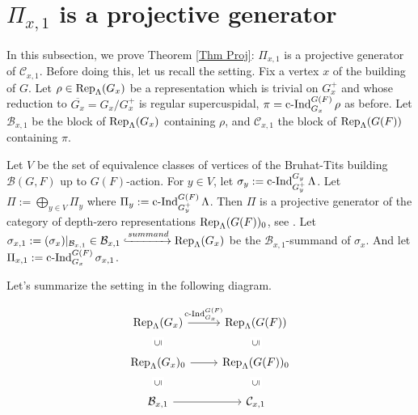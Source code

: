 		
		
		
		\section{$\Pi_{x,1}$ is a projective generator}\label{Section projective generator}
		
		In this subsection, we prove Theorem \ref{Thm Proj}: $\Pi_{x,1}$ is a projective generator of $\mathcal{C}_{x,1}$. Before doing this, let us recall the setting. Fix a vertex $x$ of the building of $G$. Let $\rho \in \operatorname{\operatorname{Rep}}_{\Lambda}(G_x)$ be a representation which is trivial on $G_x^+$ and whose reduction to $\overline{G_x}=G_x/G_x^+$ is regular supercuspidal, $\pi=\operatorname{\operatorname{c-Ind}}_{G_x}^{G(F)}\rho$ as before. Let $\mathcal{B}_{x,1}$ be the block of $\operatorname{\operatorname{Rep}}_{\Lambda}(G_x)$ containing $\rho$, and $\mathcal{C}_{x,1}$ the block of $\operatorname{\operatorname{Rep}}_{\Lambda}(G(F))$ containing $\pi$. 
		
		Let $V$ be the set of equivalence classes of vertices of the Bruhat-Tits building $\mathcal{B}(G, F)$ up to $G(F)$-action. For $y \in V$, let $\sigma_y:=\operatorname{\operatorname{c-Ind}}_{G_y^+}^{G_y}\Lambda$. Let $\Pi:=\bigoplus_{y \in V}\Pi_y$ where $\Pi_y:=\operatorname{\operatorname{c-Ind}}_{G_y^+}^{G(F)}\Lambda$. Then $\Pi$ is a projective generator of the category of depth-zero representations $\operatorname{\operatorname{Rep}}_{\Lambda}(G(F))_0$, see \cite[Appendix]{dat2009finitude}. Let $\sigma_{x,1}:=(\sigma_x)|_{\mathcal{B}_{x,1}} \in \mathcal{B}_{x,1} \xhookrightarrow{summand} \operatorname{\operatorname{Rep}}_{\Lambda}(G_x)$ be the $\mathcal{B}_{x,1}$-summand of $\sigma_x$. And let $\Pi_{x,1}:=\operatorname{\operatorname{c-Ind}}_{G_x}^{G(F)}\sigma_{x,1}$.
		
		Let's summarize the setting in the following diagram.
		
		\[\begin{tikzcd}
			{\Rep_{\Lambda}(G_x)} & {\Rep_{\Lambda}(G(F))} \\
			{\Rep_{\Lambda}(G_x)_0} & {\Rep_{\Lambda}(G(F))_0} \\
			{\mathcal{B}_{x,1}} & {\mathcal{C}_{x,1}} \\
			\arrow[from=2-1, to=2-2]
			\arrow["{\cInd_{G_x}^{G(F)}}", from=1-1, to=1-2]
			\arrow["\subseteq"{description}, sloped, draw=none, from=2-1, to=1-1]
			\arrow["\subseteq"{description}, sloped, draw=none, from=3-1, to=2-1]
			\arrow["\subseteq"{description}, sloped, draw=none, from=3-2, to=2-2]
			\arrow["\subseteq"{description}, sloped, draw=none, from=2-2, to=1-2]
			\arrow[from=3-1, to=3-2]
		\end{tikzcd}\]
		
